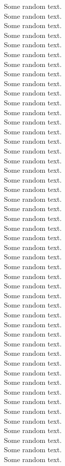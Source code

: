 Some random text.\\
Some random text.\\
Some random text.\\
Some random text.\\
Some random text.\\
Some random text.\\
Some random text.\\
Some random text.\\
Some random text.\\
Some random text.\\
Some random text.\\
Some random text.\\
Some random text.\\
Some random text.\\
Some random text.\\
Some random text.\\
Some random text.\\
Some random text.\\
Some random text.\\
Some random text.\\
Some random text.\\
Some random text.\\
Some random text.\\
Some random text.\\
Some random text.\\
Some random text.\\
Some random text.\\
Some random text.\\
Some random text.\\
Some random text.\\
Some random text.\\
Some random text.\\
Some random text.\\
Some random text.\\
Some random text.\\
Some random text.\\
Some random text.\\
Some random text.\\
Some random text.\\
Some random text.\\
Some random text.\\
Some random text.\\
Some random text.\\
Some random text.\\
Some random text.\\
Some random text.\\
Some random text.\\
Some random text.\\
  